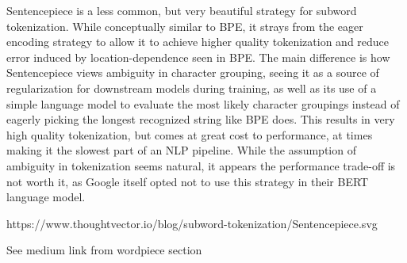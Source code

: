Sentencepiece is a less common, but very beautiful strategy for subword tokenization. While conceptually similar to BPE, it strays from the eager encoding strategy to allow it to achieve higher quality tokenization and reduce error induced by location-dependence seen in BPE. The main difference is how Sentencepiece views ambiguity in character grouping, seeing it as a source of regularization for downstream models during training, as well as its use of a simple language model to evaluate the most likely character groupings instead of eagerly picking the longest recognized string like BPE does. This results in very high quality tokenization, but comes at great cost to performance, at times making it the slowest part of an NLP pipeline. While the assumption of ambiguity in tokenization seems natural, it appears the performance trade-off is not worth it, as Google itself opted not to use this strategy in their BERT language model.

https://www.thoughtvector.io/blog/subword-tokenization/Sentencepiece.svg

See medium link from wordpiece section

